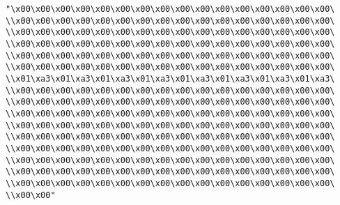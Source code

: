 \verb|"\x00\x00\x00\x00\x00\x00\x00\x00\x00\x00\x00\x00\x00\x00\x00\x00\|\newline
\verb|\\x00\x00\x00\x00\x00\x00\x00\x00\x00\x00\x00\x00\x00\x00\x00\x00\|\newline
\verb|\\x00\x00\x00\x00\x00\x00\x00\x00\x00\x00\x00\x00\x00\x00\x00\x00\|\newline
\verb|\\x00\x00\x00\x00\x00\x00\x00\x00\x00\x00\x00\x00\x00\x00\x00\x00\|\newline
\verb|\\x00\x00\x00\x00\x00\x00\x00\x00\x00\x00\x00\x00\x00\x00\x00\x00\|\newline
\verb|\\x00\x00\x00\x00\x00\x00\x00\x00\x00\x00\x00\x00\x00\x00\x00\x00\|\newline
\verb|\\x01\xa3\x01\xa3\x01\xa3\x01\xa3\x01\xa3\x01\xa3\x01\xa3\x01\xa3\|\newline
\verb|\\x00\x00\x00\x00\x00\x00\x00\x00\x00\x00\x00\x00\x00\x00\x00\x00\|\newline
\verb|\\x00\x00\x00\x00\x00\x00\x00\x00\x00\x00\x00\x00\x00\x00\x00\x00\|\newline
\verb|\\x00\x00\x00\x00\x00\x00\x00\x00\x00\x00\x00\x00\x00\x00\x00\x00\|\newline
\verb|\\x00\x00\x00\x00\x00\x00\x00\x00\x00\x00\x00\x00\x00\x00\x00\x00\|\newline
\verb|\\x00\x00\x00\x00\x00\x00\x00\x00\x00\x00\x00\x00\x00\x00\x00\x00\|\newline
\verb|\\x00\x00\x00\x00\x00\x00\x00\x00\x00\x00\x00\x00\x00\x00\x00\x00\|\newline
\verb|\\x00\x00\x00\x00\x00\x00\x00\x00\x00\x00\x00\x00\x00\x00\x00\x00\|\newline
\verb|\\x00\x00\x00\x00\x00\x00\x00\x00\x00\x00\x00\x00\x00\x00\x00\x00\|\newline
\verb|\\x00\x00\x00\x00\x00\x00\x00\x00\x00\x00\x00\x00\x00\x00\x00\x00\|\newline
\verb|\\x00\x00"|\newline

